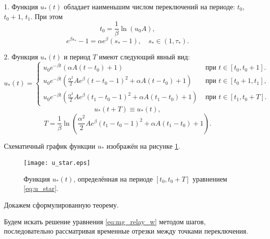 \begin{theorem}
	1. Функция $u_*(t)$ обладает наименьшим числом переключений на периоде: $t_0$, $t_0+1$, $t_1$. При этом 
	\begin{equation*}
		t_0=\frac{1}{\beta}\ln(u_0 A),
	\end{equation*}
	\begin{equation}
		e^{\beta s_*} - 1=\alpha e^{\beta}(s_* - 1), \quad s_* \in (1, \tau_*).
	\end{equation}
	
	2. Функция $u_*(t)$ и период $T$ имеют следующий явный вид: 
	\small
	\begin{equation}
		\label{eq:u_star}
		u_*(t)=
		\begin{cases}
			u_0 e^{-\beta t}(\alpha A(t-t_0)+1) & \text{ при } t\in[t_0,t_0+1].
			\\
			u_0 e^{-\beta t}\left(\frac{\alpha^2}{2}Ae^{\beta}(t-t_0-1)^2+\alpha A(t-t_0)+1\right) & \text{ при } t\in[t_0+1,t_1],
			\\
			u_0 e^{-\beta t}\left(\frac{\alpha^2}{2}Ae^{\beta}(t_1-t_0-1)^2+\alpha A(t_1-t_0)+1\right) & \text{ при } t\in[t_1,t_0+T].
		\end{cases}
	\end{equation}
	\normalsize
	\[
	u_*(t+T)\equiv u_*(t),
	\]
	\begin{equation}
		\label{eq:mg_period_T}
		T = \dfrac{1}{\beta}\ln\left( \frac{\alpha^2}{2}Ae^{\beta}(t_1-t_0-1)^2+\alpha A(t_1-t_0)+1\right). 
	\end{equation}
\end{theorem}

Схематичный график функции $u_*$ изображён на рисунке \ref{fig:u_star}.
%
\begin{figure}[h]
	\centering
	\texttt{[image: u\_star.eps]}
	\caption{Функция $u_*(t)$, определённая на периоде $[t_0, t_0 + T]$ уравнением \eqref{eq:u_star}.}
	\label{fig:u_star}
\end{figure}

Докажем сформулированную теорему.


Будем искать решение уравнения \eqref{eq:mg_relay_w} методом шагов, последовательно рассматривая временные отрезки между точками переключения. 

